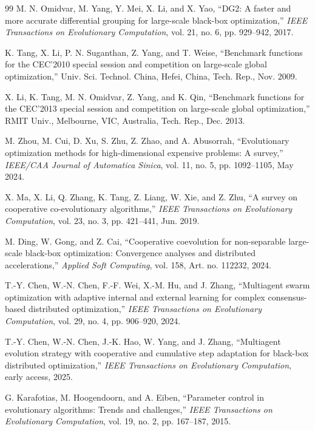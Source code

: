 \documentclass[conference]{IEEEtran}
\begin{document}
\begin{thebibliography}{99}
 M. N. Omidvar, M. Yang, Y. Mei, X. Li, and X. Yao, ``DG2: A faster and more accurate differential grouping for large-scale black-box optimization,'' \emph{IEEE Transactions on Evolutionary Computation}, vol. 21, no. 6, pp. 929--942, 2017.

 K. Tang, X. Li, P. N. Suganthan, Z. Yang, and T. Weise, ``Benchmark functions for the CEC'2010 special session and competition on large-scale global optimization,'' Univ. Sci. Technol. China, Hefei, China, Tech. Rep., Nov. 2009.

 X. Li, K. Tang, M. N. Omidvar, Z. Yang, and K. Qin, ``Benchmark functions for the CEC'2013 special session and competition on large-scale global optimization,'' RMIT Univ., Melbourne, VIC, Australia, Tech. Rep., Dec. 2013.

 M. Zhou, M. Cui, D. Xu, S. Zhu, Z. Zhao, and A. Abusorrah, ``Evolutionary optimization methods for high-dimensional expensive problems: A survey,'' \emph{IEEE/CAA Journal of Automatica Sinica}, vol. 11, no. 5, pp. 1092--1105, May 2024.

 X. Ma, X. Li, Q. Zhang, K. Tang, Z. Liang, W. Xie, and Z. Zhu, ``A survey on cooperative co-evolutionary algorithms,'' \emph{IEEE Transactions on Evolutionary Computation}, vol. 23, no. 3, pp. 421--441, Jun. 2019.

 M. Ding, W. Gong, and Z. Cai, ``Cooperative coevolution for non-separable large-scale black-box optimization: Convergence analyses and distributed accelerations,'' \emph{Applied Soft Computing}, vol. 158, Art. no. 112232, 2024.

 T.-Y. Chen, W.-N. Chen, F.-F. Wei, X.-M. Hu, and J. Zhang, ``Multiagent swarm optimization with adaptive internal and external learning for complex consensus-based distributed optimization,'' \emph{IEEE Transactions on Evolutionary Computation}, vol. 29, no. 4, pp. 906--920, 2024.

 T.-Y. Chen, W.-N. Chen, J.-K. Hao, W. Yang, and J. Zhang, ``Multiagent evolution strategy with cooperative and cumulative step adaptation for black-box distributed optimization,'' \emph{IEEE Transactions on Evolutionary Computation}, early access, 2025.

 G. Karafotias, M. Hoogendoorn, and A. Eiben, ``Parameter control in evolutionary algorithms: Trends and challenges,'' \emph{IEEE Transactions on Evolutionary Computation}, vol. 19, no. 2, pp. 167--187, 2015.


\end{thebibliography}
\end{document}
